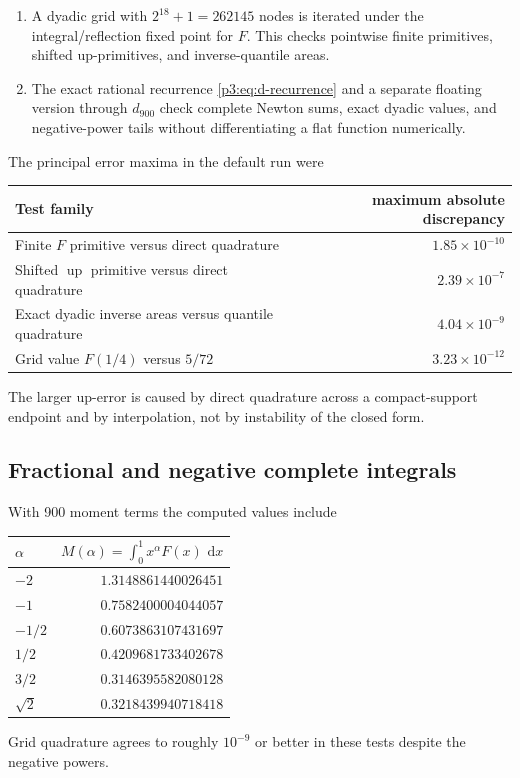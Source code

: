 \documentclass[11pt,oneside]{article}
\theoremstyle{definition}
\theoremstyle{remark}
\newcommand{\Up}{\operatorname{up}}
\newcommand{\dd}{\,\mathrm d}
\newcommand{\1}{\mathbf 1}
\begin{document}
\begin{enumerate}
\item A dyadic grid with $2^{18}+1=262145$ nodes is iterated under the integral/reflection
      fixed point for $F$.  This checks pointwise finite primitives, shifted up-primitives,
      and inverse-quantile areas.
\item The exact rational recurrence \eqref{p3:eq:d-recurrence} and a separate floating version
      through $d_{900}$ check complete Newton sums, exact dyadic values, and negative-power
      tails without differentiating a flat function numerically.
\end{enumerate}

The principal error maxima in the default run were
\begin{center}
\begin{tabular}{@{}lr@{}}
\toprule
Test family & maximum absolute discrepancy\\
\midrule
Finite $F$ primitive versus direct quadrature & $1.85\times10^{-10}$\\
Shifted $\Up$ primitive versus direct quadrature & $2.39\times10^{-7}$\\
Exact dyadic inverse areas versus quantile quadrature & $4.04\times10^{-9}$\\
Grid value $F(1/4)$ versus $5/72$ & $3.23\times10^{-12}$\\
\bottomrule
\end{tabular}
\end{center}
The larger up-error is caused by direct quadrature across a compact-support endpoint and by
interpolation, not by instability of the closed form.

\subsection{Fractional and negative complete integrals}

With 900 moment terms the computed values include
\begin{center}
\begin{tabular}{@{}lr@{}}
\toprule
$\alpha$ & $M(\alpha)=\int_0^1x^\alpha F(x)\,\dd x$\\
\midrule
$-2$ & $1.3148861440026451$\\
$-1$ & $0.7582400004044057$\\
$-1/2$ & $0.6073863107431697$\\
$1/2$ & $0.4209681733402678$\\
$3/2$ & $0.3146395582080128$\\
$\sqrt2$ & $0.3218439940718418$\\
\bottomrule
\end{tabular}
\end{center}
Grid quadrature agrees to roughly $10^{-9}$ or better in these tests despite the negative
powers.
\end{document}

